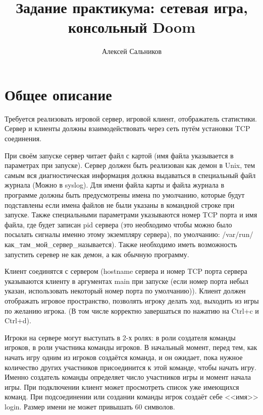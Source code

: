 \documentclass[russian,a4paper]{article}
\title{Задание практикума: сетевая игра, консольный Doom}
\author{Алексей Сальников}
\date{}
\begin{document}
\maketitle

%
%
\section{Общее описание}

Требуется реализовать игровой сервер, игровой клиент, отображатель статистики.
Сервер и клиенты должны взаимодействовать через сеть путём установки TCP
соединения.

При своём запуске сервер читает файл с картой (имя файла указывается в
параметрах при запуске). Сервер должен быть реализован как демон в
Unix, тем самым вся диагностическая информация должна выдаваться в
специальный файл журнала (Можно в syslog). Для имени файла карты и 
файла журнала в программе должны быть предусмотрены имена по умолчанию, 
которые будут подставлены если имена файлов не были указаны в командной 
строке при запуске. 
Также специальными параметрами указываются номер TCP порта 
и имя файла, где будет записан pid сервера (это необходимо чтобы можно 
было посылать сигналы именно этому экземпляру сервера), 
по умолчанию: /var/run/как\_там\_мой\_сервер\_называется). Также 
необходимо иметь возможность запустить серевер не как демон, 
а как обычную программу.

Клиент соединятся с сервером (hostname сервера и номер TCP порта
сервера указываются клиенту в аргументах main при запуске
(если номер порта небыл указан, использовать некоторый номер порта по
умолчанию)). Клиент должен отображать игровое пространство, позволять
игроку делать ход, выходить из игры по желанию игрока. (В том числе
корректно завершаться по нажатию на Ctrl+c и Ctrl+d).


Игроки на сервере могут выступать в 2-х ролях: в роли создателя команды игроков,
в роли участника команды игроков. В начальный момент, перед тем, как начать игру
одним из игроков создаётся команда, и он ожидает, пока нужное количество других 
участников присоединится к этой команде, чтобы начать игру. Именно создатель команды 
определяет число участников игры и момент начала игры. При подключении клиент может 
просмотреть список уже имеющихся команд. При подсоединении или создании команды 
игрок создаёт себе <<имя>> login. Размер имени не может привышать 60 символов.
\end{document}
